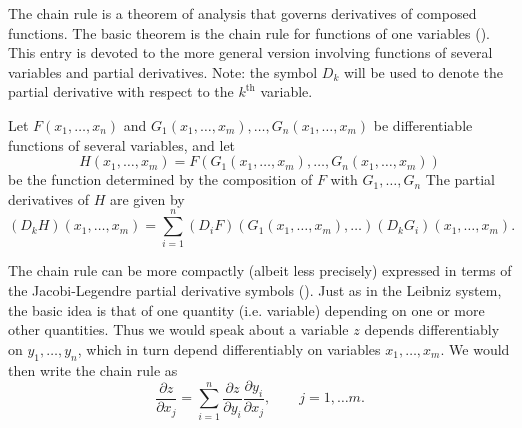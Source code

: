 \documentclass[12pt]{article}
\newcommand{\supth}{^{\text{th}}}
\begin{document}
The chain rule is a theorem of analysis that governs derivatives of
composed functions.  The basic theorem is the chain rule for functions
of one variables (). This entry
is devoted to the more general version involving functions of several
variables and partial derivatives.  Note: the symbol $D_k$ will be
used to denote the partial derivative with respect to the $k\supth$
variable.

Let $F(x_1,\ldots,x_n)$ and
$G_1(x_1,\ldots,x_m),\ldots,G_n(x_1,\ldots,x_m)$  be differentiable
functions of several variables, and let
$$H(x_1,\ldots,x_m) =
F(G_1(x_1,\ldots,x_m),\ldots,G_n(x_1,\ldots,x_m))$$
be the function determined by the composition of $F$ with
$G_1,\ldots,G_n$
The partial derivatives of $H$ are given by
$$(D_k H)(x_1,\ldots,x_m) = \sum_{i=1}^n (D_i
F)(G_1(x_1,\ldots,x_m),\ldots) (D_k G_i)(x_1,\ldots,x_m). $$

The chain rule can be more compactly (albeit less precisely) expressed
in terms of the Jacobi-Legendre partial derivative symbols
().  Just as in
the Leibniz system, the basic idea is that of one quantity (i.e.
variable) depending on one or more other quantities.  Thus we would
speak about a variable $z$ depends differentiably on $y_1,\ldots,y_n$,
which in turn depend differentiably on variables $x_1,\ldots,x_m$.  We
would then write the chain rule as
$$\frac{\partial z}{\partial x_j} = \sum_{i=1}^n \frac{\partial
  z}{\partial y_i} \frac{\partial y_i}{\partial x_j},\qquad j=1,\ldots
m.$$


\end{document}

